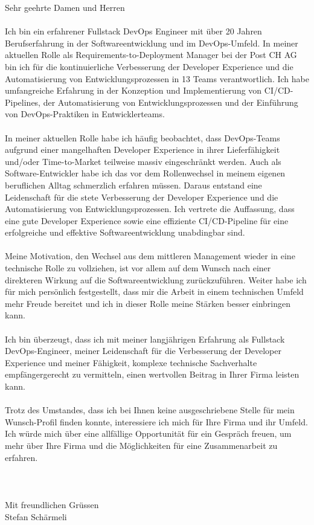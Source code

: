 \documentclass[12pt]{../developercv} %
\begin{document}
Sehr geehrte Damen und Herren
\\ \\
Ich bin ein erfahrener Fullstack DevOps Engineer mit über 20 Jahren Berufserfahrung in der Softwareentwicklung und im DevOps-Umfeld. In meiner aktuellen Rolle als Requirements-to-Deployment Manager bei der Post CH AG bin ich für die kontinuierliche Verbesserung der Developer Experience und die Automatisierung von Entwicklungsprozessen in 13 Teams verantwortlich. Ich habe umfangreiche Erfahrung in der Konzeption und Implementierung von CI/CD-Pipelines, der Automatisierung von Entwicklungsprozessen und der Einführung von DevOps-Praktiken in Entwicklerteams.
\\ \\
In meiner aktuellen Rolle habe ich häufig beobachtet, dass DevOps-Teams aufgrund einer mangelhaften Developer Experience in ihrer Lieferfähigkeit und/oder Time-to-Market teilweise massiv eingeschränkt werden. Auch als Software-Entwickler habe ich das vor dem Rollenwechsel in meinem eigenen beruflichen Alltag schmerzlich erfahren müssen. Daraus entstand eine Leidenschaft für die stete Verbesserung der Developer Experience und die Automatisierung von Entwicklungsprozessen. Ich vertrete die Auffassung, dass eine gute Developer Experience sowie eine effiziente CI/CD-Pipeline für eine erfolgreiche und effektive Softwareentwicklung unabdingbar sind.
\\ \\
Meine Motivation, den Wechsel aus dem mittleren Management wieder in eine technische Rolle zu vollziehen, ist vor allem auf dem Wunsch nach einer direkteren Wirkung auf die Softwareentwicklung zurückzuführen. Weiter habe ich für mich persönlich festgestellt, dass mir die Arbeit in einem technischen Umfeld mehr Freude bereitet und ich in dieser Rolle meine Stärken besser einbringen kann.
\\ \\
Ich bin überzeugt, dass ich mit meiner langjährigen Erfahrung als Fullstack DevOps-Engineer, meiner Leidenschaft für die Verbesserung der Developer Experience und meiner Fähigkeit, komplexe technische Sachverhalte empfängergerecht zu vermitteln, einen wertvollen Beitrag in Ihrer Firma leisten kann.
\\ \\
Trotz des Umstandes, dass ich bei Ihnen keine ausgeschriebene Stelle für mein Wunsch-Profil finden konnte, interessiere ich mich für Ihre Firma und ihr Umfeld. Ich würde mich über eine allfällige Opportunität für ein Gespräch freuen, um mehr über Ihre Firma und die Möglichkeiten für eine Zusammenarbeit zu erfahren.
\\ \\
\\ \\
Mit freundlichen Grüssen
\\
Stefan Schärmeli
\end{document}

